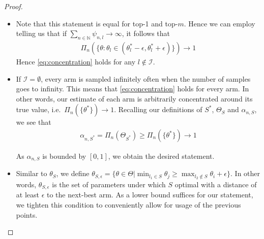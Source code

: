 \begin{proof}
  \begin{itemize}
  \item Note that this statement is equal for top-1 and top-$m$. Hence we can
  employ  telling us that if $\sum_{n \in \mathbb{N}}
  \psi_{n, l} \rightarrow \infty$, it follows that
  \begin{align}
    \Pi_n(\{\theta: \theta_l \in (\theta^*_l - \epsilon, \theta^*_l +
        \epsilon)\}) \rightarrow 1 \label{eq:concentration}
  \end{align}
  Hence \eqref{eq:concentration} holds for any $l \notin \mathcal{I}$. \item If
  $\mathcal{I} = \emptyset$, every arm is sampled infinitely often when the
  number of samples goes to infinity. This means that \eqref{eq:concentration}
  holds for every arm. In other words, our estimate of each arm is arbitrarily
  concentrated around its true value, i.e.\ $\Pi_n(\{\theta^*\}) \rightarrow 1$.
  Recalling our definitions of $S^*$, $\Theta_S$ and $\alpha_{n, S}$, we see
  that
  \begin{align}
    \alpha_{n, S^*} = \Pi_n(\Theta_{S^*}) \geq \Pi_n(\{\theta^*\}) \rightarrow 1
  \end{align}

  As $\alpha_{n, S}$ is bounded by $[0, 1]$, we obtain the desired statement.

  \item Similar to $\theta_S$, we define $\theta_{S, \epsilon} = \{\theta \in
  \Theta | \min_{l_1 \in S} \theta_j \geq \max_{l_2 \notin S} \theta_i +
  \epsilon\}$. In other words, $\theta_{S,\epsilon}$ is the set of parameters
  under which $S$ optimal with a distance of at least $\epsilon$ to the
  next-best arm. As a lower bound suffices for our statement, we tighten this
  condition to conveniently allow for usage of the previous points.


\end{itemize}
\end{proof}
